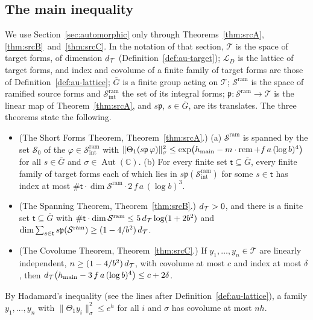 \documentclass[10pt]{amsart}
\theoremstyle{definition}
\theoremstyle{remark}
\newcommand{\anThmA}{\ref{thm:srcA}}\newcommand{\anThmB}{\ref{thm:srcB}}\newcommand{\anThmC}{\ref{thm:srcC}}
\begin{document}
\subsection{The main inequality}\label{an:ssec-main}
We use Section~\ref{sec:automorphic} only through
Theorems~\anThmA, \anThmB\ and~\anThmC. In the notation of that section,
$\mathcal T$ is the space of target forms, of dimension $d_{\mathcal T}$
(Definition~\ref{def:au-target}); $\mathcal L_D$ is the lattice of target
forms, and index and covolume of a finite family of target forms are those of
Definition~\ref{def:au-lattice}; $\overline G$ is a finite group acting on
$\mathcal T$; $\mathcal S^{\mathrm{ram}}$ is the space of ramified source
forms and $\mathcal S^{\mathrm{ram}}_{\mathrm{int}}$ the set of its integral
forms; $\mathfrak p\colon\mathcal S^{\mathrm{ram}}\to\mathcal T$ is the
linear map of Theorem~\anThmA, and $s\mathfrak p$, $s\in\overline G$, are its
translates. The three theorems state the following.
\begin{itemize}
\item[(SF)] (The Short Forms Theorem, Theorem~\anThmA.) (a) $\mathcal S^{\mathrm{ram}}$ is spanned by
the set $\mathcal S_0$ of the
$\varphi\in\mathcal S^{\mathrm{ram}}_{\mathrm{int}}$ with
$\|\Theta_1(s\mathfrak p\,\varphi)\|_\sigma^2\le\exp\bigl(h_{\mathrm{main}}-m\cdot\operatorname{rem}+f\,a\,(\log b)^{4}\bigr)$
for all $s\in\overline G$ and $\sigma\in\operatorname{Aut}(\mathbb C)$.
(b) For every finite set $\mathsf t\subseteq\overline G$, every finite family
of target forms each of which lies in
$s\mathfrak p(\mathcal S^{\mathrm{ram}}_{\mathrm{int}})$ for some
$s\in\mathsf t$ has index at most
$\#\mathsf t\cdot\dim\mathcal S^{\mathrm{ram}}\cdot2\,f\,a\,(\log b)^{3}$.
\item[(Sp)] (The Spanning Theorem, Theorem~\anThmB.) $d_{\mathcal T}>0$, and there is a finite set
$\mathsf t\subseteq\overline G$ with
$\#\mathsf t\cdot\dim\mathcal S^{\mathrm{ram}}\le5\,d_{\mathcal T}\log(1+2b^{2})$ and
$\dim\sum_{s\in\mathsf t}s\mathfrak p(\mathcal S^{\mathrm{ram}})\ge(1-4/b^{2})\,d_{\mathcal T}$.
\item[(Cv)] (The Covolume Theorem, Theorem~\anThmC.) If $y_1,\dots,y_n\in\mathcal T$ are linearly
independent, $n\ge(1-4/b^{2})\,d_{\mathcal T}$, with covolume at most $c$ and index at
most $\delta$, then $d_{\mathcal T}\bigl(h_{\mathrm{main}}-3\,f\,a\,(\log b)^{4}\bigr)\le c+2\delta$.
\end{itemize}
By Hadamard's inequality (see the lines after
Definition~\ref{def:au-lattice}), a family $y_1,\dots,y_n$ with
$\|\Theta_1y_i\|_\sigma^2\le e^{h}$ for all $i$ and $\sigma$ has covolume at
most $nh$.
\end{document}

